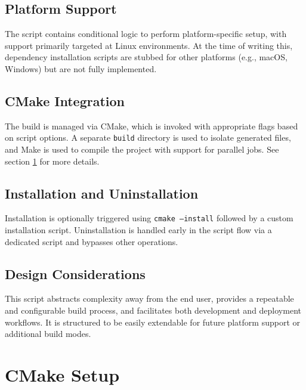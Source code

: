 \subsection{Platform Support}

The script contains conditional logic to perform platform-specific setup, with support primarily targeted at Linux environments. At the time of writing this, dependency installation scripts are stubbed for other platforms (e.g., macOS, Windows) but are not fully implemented.

\subsection{CMake Integration}

The build is managed via CMake, which is invoked with appropriate flags based on script options. A separate \texttt{build} directory is used to isolate generated files, and Make is used to compile the project with support for parallel jobs. See section \ref{sec:CMake-setup} for more details.

\subsection{Installation and Uninstallation}

Installation is optionally triggered using \texttt{cmake --install} followed by a custom installation script. Uninstallation is handled early in the script flow via a dedicated script and bypasses other operations.

\subsection{Design Considerations}

This script abstracts complexity away from the end user, provides a repeatable and configurable build process, and facilitates both development and deployment workflows. It is structured to be easily extendable for future platform support or additional build modes.















\section{CMake Setup}
\label{sec:CMake-setup}

